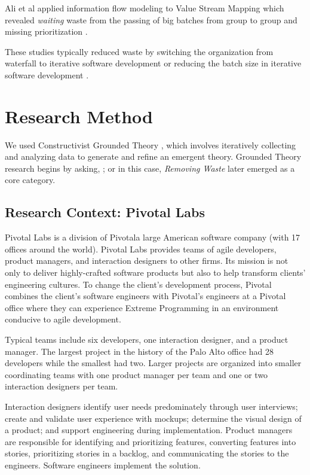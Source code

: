 Ali et al applied information flow modeling to Value Stream Mapping which revealed \textit{waiting} waste from the passing of big batches from group to group and missing prioritization \cite{Ali2016}.


These studies typically reduced waste by switching the organization from waterfall to iterative software development or reducing the batch size in iterative software development \cite{Ali2016, Khurum2014, Mujtaba2010}.
\section{Research Method}
\label{ResearchMethod}


We used Constructivist Grounded Theory \cite{Charmaz}, which involves iteratively collecting and analyzing data to generate and refine an emergent theory. Grounded Theory research begins by asking,  \cite{GlaserTheoreticalSensitivity}; or in this case,  \textit{Removing Waste}  later emerged as a core category.
\subsection{Research Context: Pivotal Labs}
Pivotal Labs is a division of Pivotal\textemdash a large American software company (with 17 offices around the world). Pivotal Labs provides teams of agile developers, product managers, and interaction designers to other firms. Its mission is not only to deliver highly-crafted software products but also to help transform clients' engineering cultures. To change the client's development process, Pivotal combines the client's software engineers with Pivotal's engineers at a Pivotal office where they can experience Extreme Programming \cite{BeckExtremeProgramming2004} in an environment conducive to agile development. 


Typical teams include six developers, one interaction designer, and a product manager. The largest project in the history of the Palo Alto office had 28 developers while the smallest had two. Larger projects are organized into smaller coordinating teams with one product manager per team and one or two interaction designers per team.


Interaction designers identify user needs predominately through user interviews; create and validate user experience with mockups; determine the visual design of a product; and support engineering during implementation. Product managers are responsible for identifying and prioritizing features, converting features into stories, prioritizing stories in a backlog, and communicating the stories to the engineers. Software engineers implement the solution. 


